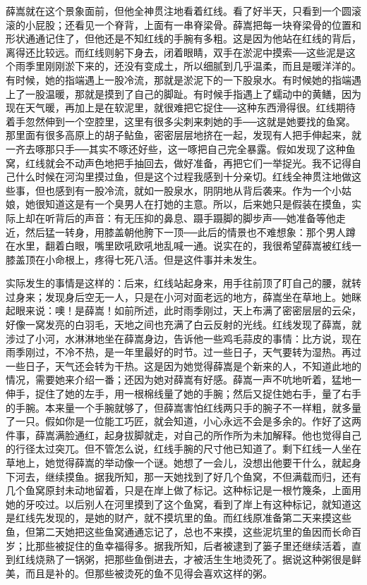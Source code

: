薛嵩就在这个景象面前，但他全神贯注地看着红线。看了好半天，只看到一个圆滚滚的小屁股；还看见一个脊背，上面有一串脊梁骨。薛嵩把每一块脊梁骨的位置和形状通通记住了，但他还是不知红线的手腕有多粗。这是因为他站在红线的背后，离得还比较远。而红线则躬下身去，闭着眼睛，双手在淤泥中摸索──这些泥是这个雨季里刚刚淤下来的，还没有变成土，所以细腻到几乎温柔，而且是暖洋洋的。有时候，她的指端遇上一股冷流，那就是淤泥下的一下股泉水。有时候她的指端遇上了一股温暖，那就是摸到了自己的脚趾。有时候手指遇上了蠕动中的黄鳝，因为现在天气暖，再加上是在软泥里，就很难把它捉住──这种东西滑得很。红线期待着手忽然伸到一个空腔里，这里有很多尖刺来刺她的手──这就是她要找的鱼窝。那里面有很多高原上的胡子鲇鱼，密密层层地挤在一起，发现有人把手伸起来，就一齐去啄那只手──其实不啄还好些，这一啄把自己完全暴露。假如发现了这种鱼窝，红线就会不动声色地把手抽回去，做好准备，再把它们一举捉光。我不记得自己什么时候在河沟里摸过鱼，但是这个过程我感到十分亲切。红线全神贯注地做这些事，但也感到有一股冷流，就如一股泉水，阴阴地从背后袭来。作为一个小姑娘，她很知道这是有一个臭男人在打她的主意。所以，后来她只是假装在摸鱼，实际上却在听背后的声音：有无压抑的鼻息、蹑手蹑脚的脚步声──她准备等他走近，然后猛一转身，用膝盖朝他胯下一顶──此后的情景也不难想象：那个男人蹲在水里，翻着白眼，嘴里欧吼欧吼地乱喊一通。说实在的，我很希望薛嵩被红线一膝盖顶在小命根上，疼得七死八活。但是这件事并未发生。 

实际发生的事情是这样的：后来，红线站起身来，用手往前顶了盯自己的腰，就转过身来；发现身后空无一人，只是在小河对面老远的地方，薛嵩坐在草地上。她眯起眼来说：噢！是薛嵩！如前所述，此时雨季刚过，天上布满了密密层层的云朵，好像一窝发亮的白羽毛，天地之间也充满了白云反射的光线。红线发现了薛嵩，就涉过了小河，水淋淋地坐在薛嵩身边，告诉他一些鸡毛蒜皮的事情：比方说，现在雨季刚过，不冷不热，是一年里最好的时节。过一些日子，天气要转为湿热。再过一些日子，天气还会转为干热。这是因为她觉得薛嵩是个新来的人，不知道此地的情况，需要她来介绍一番；还因为她对薛嵩有好感。薛嵩一声不吭地听着，猛地一伸手，捉住了她的左手，用一根棉线量了她的手腕；然后又捉住她右手，量了右手的手腕。本来量一个手腕就够了，但薛嵩害怕红线两只手的腕子不一样粗，就多量了一只。假如你是一位能工巧匠，就会知道，小心永远不会是多余的。作好了这两件事，薛嵩满脸通红，起身拔脚就走，对自己的所作所为未加解释。他也觉得自己的行径太过突兀。但不管怎么说，红线手腕的尺寸他已知道了。剩下红线一人坐在草地上，她觉得薛嵩的举动像一个谜。她想了一会儿，没想出他要干什么，就起身下河去，继续摸鱼。据我所知，那一天她找到了好几个鱼窝，不但满载而归，还有几个鱼窝原封未动地留着，只是在岸上做了标记。这种标记是一根竹篾条，上面用她的牙咬过。以后别人在河里摸到了这个鱼窝，看到了岸上有这种标记，就知道这是红线先发现的，是她的财产，就不摸坑里的鱼。而红线原准备第二天来摸这些鱼，但第二天她把这些鱼窝通通忘记了，总也不来摸，这些泥坑里的鱼因而长命百岁；比那些被捉住的鱼幸福得多。据我所知，后者被逮到了篓子里还继续活着，直到红线烧熟了一锅粥，把那些鱼倒进去，才被活生生地烫死了。据说这种粥很是鲜美，而且是补的。但那些被烫死的鱼不见得会喜欢这样的粥。 

